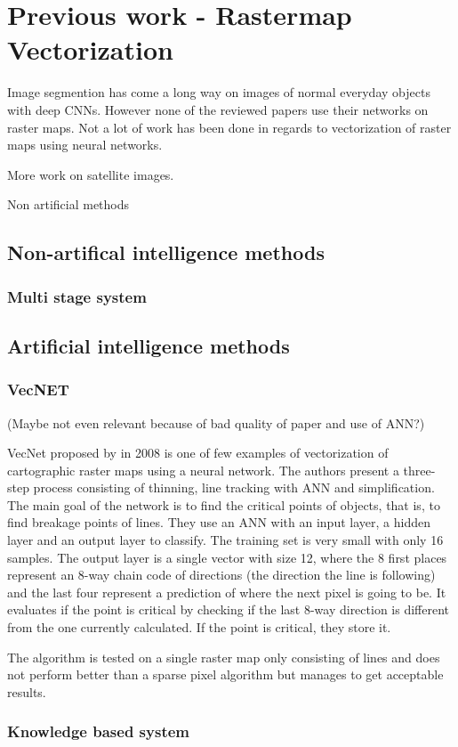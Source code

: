 \chapter{Previous work - Rastermap Vectorization}
Image segmention has come a long way on images of normal everyday objects with deep CNNs. However none of the reviewed papers use their networks on raster maps. Not a lot of work has been done in regards to vectorization of raster maps using neural networks. 

More work on satellite images.

Non artificial methods 

\section{Non-artifical intelligence methods}
\subsection{Multi stage system}
\cite{Oka2012}


\section{Artificial intelligence methods}

\subsection{VecNET}
(Maybe not even relevant because of bad quality of paper and use of ANN?)

VecNet proposed by \citeauthor{Karabork2008} in 2008 is one of few examples of vectorization of cartographic raster maps using a neural network. The authors present a three-step process consisting of thinning, line tracking with ANN and simplification. The main goal of the network is to find the critical points of objects, that is, to find breakage points of lines. They use an ANN with an input layer, a hidden layer and an output layer to classify. The training set is very small with only 16 samples. The output layer is a single vector with size 12, where the 8 first places represent an 8-way chain code of directions (the direction the line is following) and the last four represent a prediction of where the next pixel is going to be. It evaluates if the point is critical by checking if the last 8-way direction is different from the one currently calculated. If the point is critical, they store it.

The algorithm is tested on a single raster map only consisting of lines and does not perform better than a sparse pixel algorithm but manages to get acceptable results.

\subsection{Knowledge based system}
\cite{Lee2000}

\cite{Song2000}


